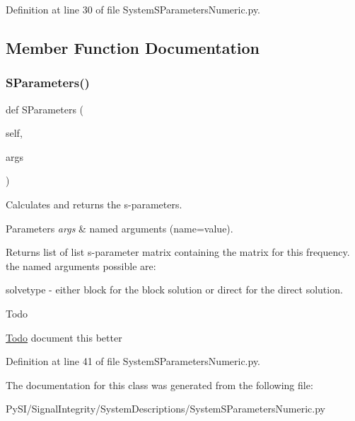 Definition at line 30 of file System\+S\+Parameters\+Numeric.\+py.



\subsection{Member Function Documentation}
\mbox{\label{classSignalIntegrity_1_1SystemDescriptions_1_1SystemSParametersNumeric_1_1SystemSParametersNumeric_a021c12a7e391dbcb5904bb9a1e3c6294}} 
\subsubsection{\texorpdfstring{S\+Parameters()}{SParameters()}}
{\footnotesize\ttfamily def S\+Parameters (\begin{DoxyParamCaption}\item[{}]{self,  }\item[{}]{args }\end{DoxyParamCaption})}



Calculates and returns the s-\/parameters. 


\begin{DoxyParams}{Parameters}
{\em args} & named arguments (name=value). \\
\hline
\end{DoxyParams}
\begin{DoxyReturn}{Returns}
list of list s-\/parameter matrix containing the matrix for this frequency. the named arguments possible are\+:
\begin{DoxyItemize}
\item \textquotesingle{}solvetype\textquotesingle{} -\/ either \textquotesingle{}block\textquotesingle{} for the block solution or \textquotesingle{}direct\textquotesingle{} for the direct solution. 
\end{DoxyItemize}
\end{DoxyReturn}
\begin{DoxyRefDesc}{Todo}
\item[\hyperlink{todo__todo000017}{Todo}]document this better \end{DoxyRefDesc}


Definition at line 41 of file System\+S\+Parameters\+Numeric.\+py.



The documentation for this class was generated from the following file\+:\begin{DoxyCompactItemize}
\item 
Py\+S\+I/\+Signal\+Integrity/\+System\+Descriptions/System\+S\+Parameters\+Numeric.\+py\end{DoxyCompactItemize}
